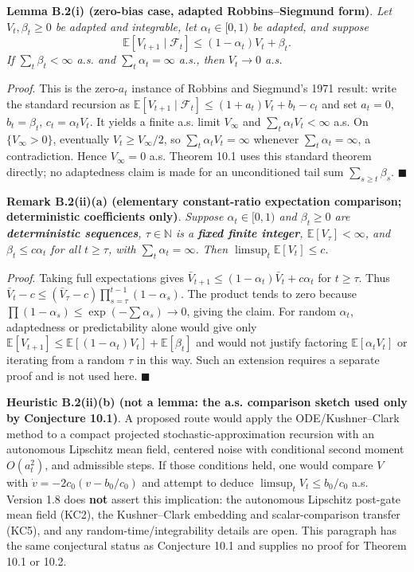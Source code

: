\documentclass[
  11pt]{article}
\begin{document}
\textbf{Lemma B.2(i) (zero-bias case, adapted Robbins--Siegmund form)}.
\emph{Let \(V_t,\beta_t\ge0\) be adapted and integrable, let
\(\alpha_t\in[0,1)\) be adapted, and suppose}
\[\mathbb E[V_{t+1}\mid\mathcal F_t]\le(1-\alpha_t)V_t+\beta_t.\tag{B.1}\]
\emph{If \(\sum_t\beta_t<\infty\) a.s. and \(\sum_t\alpha_t=\infty\)
a.s., then \(V_t\to0\) a.s.}

\emph{Proof}. This is the zero-\(a_t\) instance of Robbins and
Siegmund's 1971 result: write the standard recursion as
\(\mathbb E[V_{t+1}\mid\mathcal F_t]\le(1+a_t)V_t+b_t-c_t\) and set
\(a_t=0\), \(b_t=\beta_t\), \(c_t=\alpha_tV_t\). It yields a finite a.s.
limit \(V_\infty\) and \(\sum_t\alpha_tV_t<\infty\) a.s. On
\(\{V_\infty>0\}\), eventually \(V_t\ge V_\infty/2\), so
\(\sum_t\alpha_tV_t=\infty\) whenever \(\sum_t\alpha_t=\infty\), a
contradiction. Hence \(V_\infty=0\) a.s. Theorem 10.1 uses this standard
theorem directly; no adaptedness claim is made for an unconditioned tail
sum \(\sum_{s\ge t}\beta_s\). \(\blacksquare\)

\textbf{Remark B.2(ii)(a) (elementary constant-ratio expectation
comparison; deterministic coefficients only)}. \emph{Suppose
\(\alpha_t\in[0,1)\) and \(\beta_t\ge0\) are \textbf{deterministic
sequences}, \(\tau\in\mathbb N\) is a \textbf{fixed finite integer},
\(\mathbb E[V_\tau]<\infty\), and \(\beta_t\le c\alpha_t\) for all
\(t\ge\tau\), with \(\sum_t\alpha_t=\infty\). Then
\(\limsup_t\mathbb E[V_t]\le c\).}

\emph{Proof}. Taking full expectations gives
\(\bar V_{t+1}\le(1-\alpha_t)\bar V_t+c\alpha_t\) for \(t\ge\tau\). Thus
\(\bar V_t-c\le(\bar V_\tau-c)\prod_{s=\tau}^{t-1}(1-\alpha_s)\). The
product tends to zero because
\(\prod(1-\alpha_s)\le\exp(-\sum\alpha_s)\to0\), giving the claim. For
random \(\alpha_t\), adaptedness or predictability alone would give only
\(\mathbb E[V_{t+1}]\le\mathbb E[(1-\alpha_t)V_t]+\mathbb E[\beta_t]\)
and would not justify factoring \(\mathbb E[\alpha_tV_t]\) or iterating
from a random \(\tau\) in this way. Such an extension requires a
separate proof and is not used here. \(\blacksquare\)

\textbf{Heuristic B.2(ii)(b) (not a lemma: the a.s. comparison sketch
used only by Conjecture 10.1)}. A proposed route would apply the
ODE/Kushner--Clark method to a compact projected
stochastic-approximation recursion with an autonomous Lipschitz mean
field, centered noise with conditional second moment \(O(a_t^2)\), and
admissible steps. If those conditions held, one would compare \(V\) with
\(\dot v=-2c_0(v-b_0/c_0)\) and attempt to deduce
\(\limsup_tV_t\le b_0/c_0\) a.s. Version 1.8 does \textbf{not} assert
this implication: the autonomous Lipschitz post-gate mean field (KC2),
the Kushner--Clark embedding and scalar-comparison transfer (KC5), and
any random-time/integrability details are open. This paragraph has the
same conjectural status as Conjecture 10.1 and supplies no proof for
Theorem 10.1 or 10.2.
\end{document}
